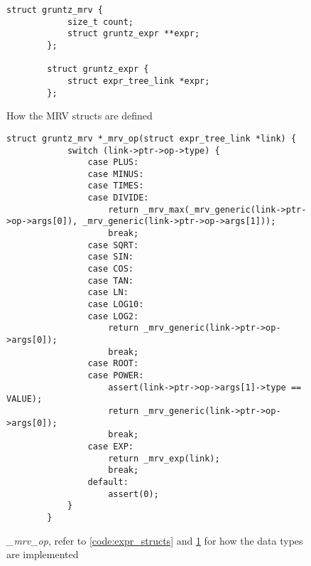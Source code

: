 \begin{figure}
	\centering
	\begin{lstlisting}[style=CStyle]
		struct gruntz_mrv {
			size_t count;
			struct gruntz_expr **expr;
		};
		
		struct gruntz_expr {
			struct expr_tree_link *expr;
		};
	\end{lstlisting}
	\caption{How the MRV structs are defined} \label{code:mrv_structs}
\end{figure}

\begin{figure}
	\centering
	\begin{lstlisting}[style=CStyle]
		struct gruntz_mrv *_mrv_op(struct expr_tree_link *link) {
			switch (link->ptr->op->type) {
				case PLUS:
				case MINUS:
				case TIMES:
				case DIVIDE:
					return _mrv_max(_mrv_generic(link->ptr->op->args[0]), _mrv_generic(link->ptr->op->args[1]));
					break;
				case SQRT:
				case SIN:
				case COS:
				case TAN:
				case LN:
				case LOG10:
				case LOG2:
					return _mrv_generic(link->ptr->op->args[0]);
					break;
				case ROOT:
				case POWER:
					assert(link->ptr->op->args[1]->type == VALUE);
					return _mrv_generic(link->ptr->op->args[0]);
					break;
				case EXP:
					return _mrv_exp(link);
					break;
				default:
					assert(0);
			}
		}
	\end{lstlisting}
	\caption{\textit{\_mrv\_op}, refer to \cref{code:expr_structs} and \cref{code:mrv_structs} for how the data types are implemented} \label{code:mrv_op}
\end{figure}